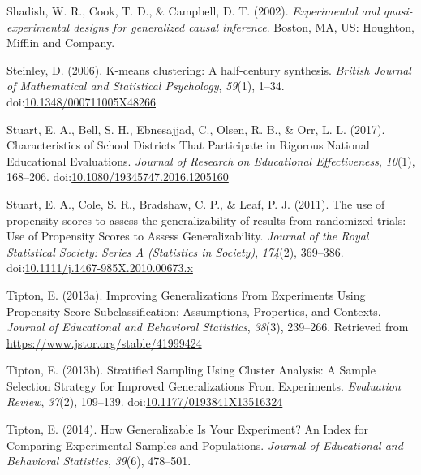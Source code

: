 \documentclass[man,floatsintext]{apa6}
\begin{document}
\leavevmode\hypertarget{ref-shadishExperimentalQuasiexperimentalDesigns2002}{}%
Shadish, W. R., Cook, T. D., \& Campbell, D. T. (2002). \emph{Experimental and quasi-experimental designs for generalized causal inference}. Boston, MA, US: Houghton, Mifflin and Company.

\leavevmode\hypertarget{ref-steinleyKmeansClusteringHalfcentury2006}{}%
Steinley, D. (2006). K-means clustering: A half-century synthesis. \emph{British Journal of Mathematical and Statistical Psychology}, \emph{59}(1), 1--34. doi:\href{https://doi.org/10.1348/000711005X48266}{10.1348/000711005X48266}

\leavevmode\hypertarget{ref-stuartCharacteristicsSchoolDistricts2017}{}%
Stuart, E. A., Bell, S. H., Ebnesajjad, C., Olsen, R. B., \& Orr, L. L. (2017). Characteristics of School Districts That Participate in Rigorous National Educational Evaluations. \emph{Journal of Research on Educational Effectiveness}, \emph{10}(1), 168--206. doi:\href{https://doi.org/10.1080/19345747.2016.1205160}{10.1080/19345747.2016.1205160}

\leavevmode\hypertarget{ref-stuartUsePropensityScores2011}{}%
Stuart, E. A., Cole, S. R., Bradshaw, C. P., \& Leaf, P. J. (2011). The use of propensity scores to assess the generalizability of results from randomized trials: Use of Propensity Scores to Assess Generalizability. \emph{Journal of the Royal Statistical Society: Series A (Statistics in Society)}, \emph{174}(2), 369--386. doi:\href{https://doi.org/10.1111/j.1467-985X.2010.00673.x}{10.1111/j.1467-985X.2010.00673.x}

\leavevmode\hypertarget{ref-tiptonImprovingGeneralizationsExperiments2013}{}%
Tipton, E. (2013a). Improving Generalizations From Experiments Using Propensity Score Subclassification: Assumptions, Properties, and Contexts. \emph{Journal of Educational and Behavioral Statistics}, \emph{38}(3), 239--266. Retrieved from \url{https://www.jstor.org/stable/41999424}

\leavevmode\hypertarget{ref-tiptonStratifiedSamplingUsing2013}{}%
Tipton, E. (2013b). Stratified Sampling Using Cluster Analysis: A Sample Selection Strategy for Improved Generalizations From Experiments. \emph{Evaluation Review}, \emph{37}(2), 109--139. doi:\href{https://doi.org/10.1177/0193841X13516324}{10.1177/0193841X13516324}

\leavevmode\hypertarget{ref-tiptonHowGeneralizableYour2014}{}%
Tipton, E. (2014). How Generalizable Is Your Experiment? An Index for Comparing Experimental Samples and Populations. \emph{Journal of Educational and Behavioral Statistics}, \emph{39}(6), 478--501.
\end{document}
